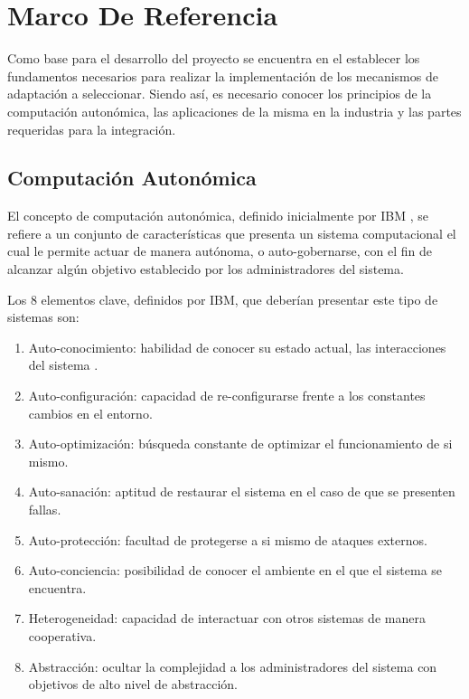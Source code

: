 \documentclass[12pt]{article}
\begin{document}
    \pagebreak

    \section{Marco De Referencia}

    Como base para el desarrollo del proyecto se encuentra en el establecer los fundamentos necesarios para realizar la implementación de los mecanismos de adaptación a seleccionar. Siendo así, es necesario conocer los principios de la computación autonómica, las aplicaciones de la misma en la industria y las partes requeridas para la integración.

    \subsection{Computación Autonómica}
    

    El concepto de computación autonómica, definido inicialmente por IBM \citeyear{horn_2001}, se refiere a un conjunto de características que presenta un sistema computacional el cual le permite actuar de manera autónoma, o auto-gobernarse, con el fin de alcanzar algún objetivo establecido por los administradores del sistema.


    Los 8 elementos clave, definidos por IBM, que deberían presentar este tipo de sistemas son:
    \begin{multicols}{2}
    \begin{enumerate}
        \item Auto-conocimiento: habilidad de conocer su estado actual, las interacciones del sistema .
        \item Auto-configuración: capacidad de re-configurarse frente a los constantes cambios en el entorno.
        \item Auto-optimización: búsqueda constante de optimizar el funcionamiento de si mismo.
        \item Auto-sanación: aptitud de restaurar el sistema en el caso de que se presenten fallas.
        \item Auto-protección: facultad de protegerse a si mismo de ataques externos.
        \item Auto-conciencia: posibilidad de conocer el ambiente en el que el sistema se encuentra.
        \item Heterogeneidad: capacidad de interactuar con otros sistemas de manera cooperativa.
        \item Abstracción: ocultar la complejidad a los administradores del sistema con objetivos de alto nivel de abstracción.
    \end{enumerate}
    \end{multicols}
\end{document}
